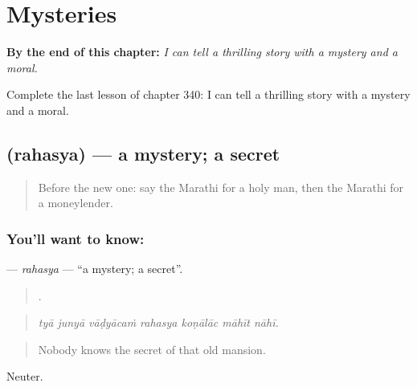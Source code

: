
\chapter{Mysteries}
\label{ch:mr-mysteries}

\begin{chapteropening}
\textbf{By the end of this chapter:} \emph{I can tell a thrilling story with a mystery and a moral.}

Complete the last lesson of chapter 340: I can tell a thrilling story with a mystery and a moral.
\end{chapteropening}

\section[\texorpdfstring{\mr{रहस्य} (rahasya)}{रहस्य (rahasya)}]{ (rahasya) — a mystery; a secret}

\label{lesson:MR-C340-rahasya}



\begin{quote}
Before the new one: say the Marathi for a holy man, then the Marathi for a moneylender.
\end{quote}

\subsection*{You'll want to know: }
\textbf{} — \emph{rahasya} — \textquotedblleft{}a mystery; a secret\textquotedblright{}.

\begin{quote}
      .
\end{quote}

\begin{quote}
\emph{tyā junyā vāḍyācaṁ rahasya koṇālāc māhīt nāhī.}
\end{quote}

\begin{quote}
Nobody knows the secret of that old mansion.
\end{quote}

Neuter.

